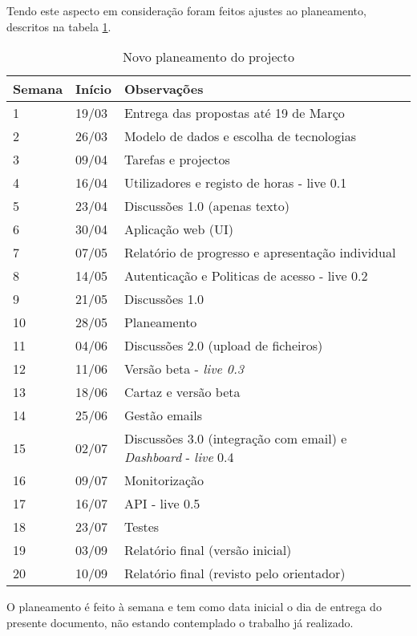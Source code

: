 \documentclass[]{article}
\begin{document}
Tendo este aspecto em consideração foram feitos ajustes ao planeamento, descritos na tabela \ref{tabplan}.
\begin{table}[!ht]
\centering
\begin{tabular}{| l | l | l |}
\hline
\textbf{Semana} & \textbf{Início} & \textbf{Observações}  \\
\hline
1	& 19/03 &	Entrega das propostas até 19 de Março \\
\hline
2	& 26/03 &	Modelo de dados e escolha de tecnologias \\
\hline
3	& 09/04 &	Tarefas e projectos \\
\hline
4	& 16/04 &	Utilizadores e registo de horas - live 0.1 \\
\hline
5	& 23/04 &	Discussões 1.0 (apenas texto) \\
\hline
6	& 30/04 &	Aplicação web (UI) \\
\hline
7	& 07/05 &	Relatório de progresso e apresentação individual \\
\hline
8	& 14/05 &	Autenticação e Politicas de acesso - live 0.2 \\
\hline
9	& 21/05 &	Discussões 1.0 \\
\hline
10	& 28/05 &	Planeamento \\
\hline
11	& 04/06 &	Discussões 2.0 (upload de ficheiros) \\
\hline
12	& 11/06 &	Versão beta - \emph{live 0.3} \\
\hline
13	& 18/06 &	Cartaz e versão beta \\
\hline
14	& 25/06 &	Gestão emails \\
\hline
15	& 02/07	& 	Discussões 3.0 (integração com email) e \emph{Dashboard} - \emph{live} 0.4 \\
\hline
16	& 09/07	&	Monitorização \\
\hline
17	& 16/07 &	API - live 0.5 \\
\hline
18	& 23/07 &	Testes \\
\hline
19	& 03/09 &	Relatório final (versão inicial) \\
\hline
20	& 10/09 &	Relatório final (revisto pelo orientador) \\
\hline
\end{tabular}
\caption{Novo planeamento do projecto}
\label{tabplan}
\end{table}
O planeamento é feito à semana e tem como data inicial o dia de entrega do presente documento, não estando contemplado o trabalho já realizado.
\vfill
\newpage
\end{document}
